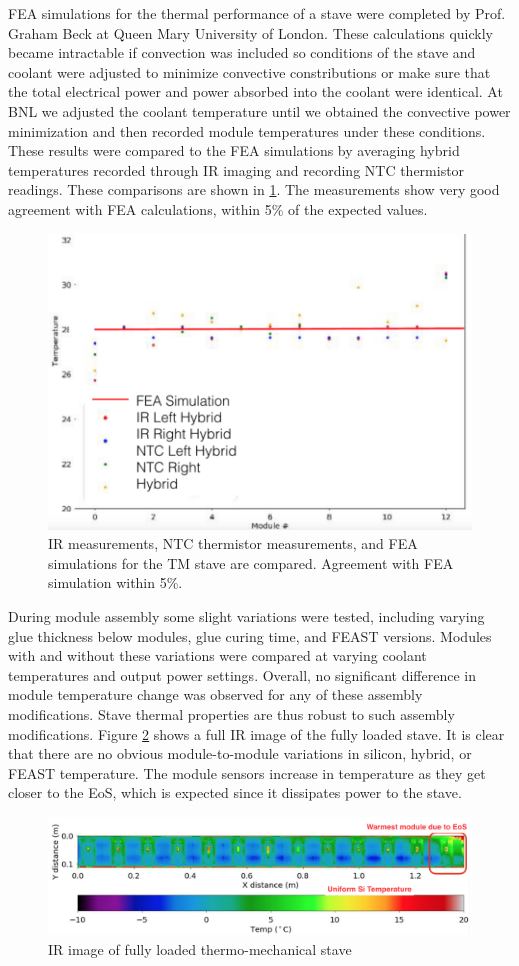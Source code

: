 FEA simulations for the thermal performance of a stave were completed by Prof. Graham Beck at Queen Mary University of London. These calculations quickly became intractable if convection was included so conditions of the stave and coolant were adjusted to minimize convective constributions or make sure that the total electrical power and power absorbed into the coolant were identical. At BNL we adjusted the coolant temperature until we obtained the convective power minimization and then recorded module temperatures under these conditions. These results were compared to the FEA simulations by averaging hybrid temperatures recorded through IR imaging and recording NTC thermistor readings. These comparisons are shown in \ref{fig:FEAcompare}. The measurements show very good agreement with FEA calculations, within 5\% of the expected values.

\begin{figure}[!h]
        \centering
    \includegraphics[width=.4\textwidth]{Pictures/FEAcompare.png}
    \caption{IR measurements, NTC thermistor measurements, and FEA simulations for the TM stave are compared. Agreement with FEA simulation within 5\%.}
    \label{fig:FEAcompare}
\end{figure} 

During module assembly some slight variations were tested, including varying glue thickness below modules, glue curing time, and FEAST versions. Modules with and without these variations were compared at varying coolant temperatures and output power settings. Overall, no significant difference in module temperature change was observed for any of these assembly modifications. Stave thermal properties are thus robust to such assembly modifications. Figure \ref{fig:IRimagetotal} shows a full IR image of the fully loaded stave. It is clear that there are no obvious module-to-module variations in silicon, hybrid, or FEAST temperature. The module sensors increase in temperature as they get closer to the EoS, which is expected since it dissipates power to the stave.

\begin{figure}[!h]
        \centering
    \includegraphics[width=.8\textwidth]{Pictures/IRimagetotal.png}
    \caption{IR image of fully loaded thermo-mechanical stave}
    \label{fig:IRimagetotal}
\end{figure} 
 
